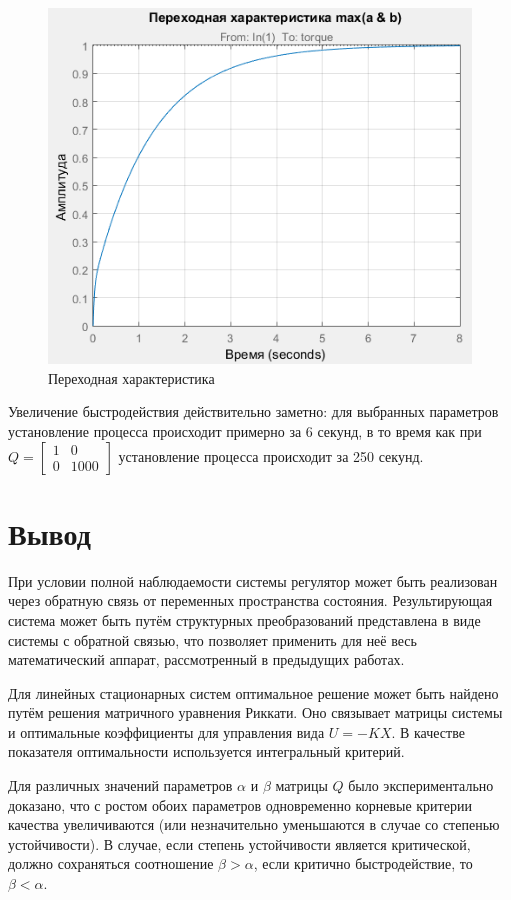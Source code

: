 \documentclass[14pt,a4paper,report]{report}
\begin{document}
\begin{figure}[h!]
	\centering
	\includegraphics[scale = 0.70]{images/4.png}
	\caption{Переходная характеристика}
	\label{image:6}
\end{figure}

Увеличение быстродействия действительно заметно: для выбранных параметров установление процесса происходит примерно за 6 секунд, в то время как при $Q=\begin{bmatrix}
1 & 0 \\
0 & 1000 
\end{bmatrix}$ установление процесса происходит за 250 секунд.

\section{Вывод}

При условии полной наблюдаемости системы регулятор может быть реализован через обратную связь от переменных пространства состояния. Результирующая система может быть путём структурных преобразований представлена в виде системы с обратной связью, что позволяет применить для неё весь математический аппарат, рассмотренный в предыдущих работах.

Для линейных стационарных систем оптимальное решение может быть найдено путём решения матричного уравнения Риккати. Оно связывает матрицы системы и оптимальные коэффициенты для управления вида $U=-KX$. В качестве показателя оптимальности используется интегральный критерий.

Для различных значений параметров $\alpha$ и $\beta$ матрицы $Q$ было экспериментально доказано, что с ростом обоих параметров одновременно корневые критерии качества увеличиваются (или незначительно уменьшаются в случае со степенью устойчивости). В случае, если степень устойчивости является критической, должно сохраняться соотношение $\beta>\alpha$, если критично быстродействие, то $\beta<\alpha$.
\end{document}
